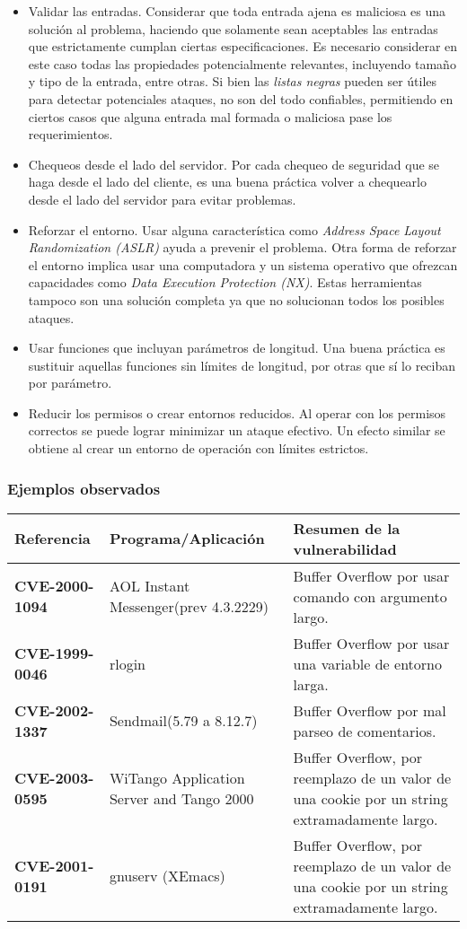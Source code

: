 \begin{itemize}
    \item Validar las entradas.
	Considerar que toda entrada ajena es maliciosa es una solución al problema, haciendo que solamente sean aceptables las entradas que estrictamente cumplan ciertas especificaciones.
	Es necesario considerar en este caso todas las propiedades potencialmente relevantes, incluyendo tamaño y tipo de la entrada, entre otras.
	Si bien las \textit{listas negras} pueden ser útiles para detectar potenciales ataques, no son del todo confiables, permitiendo en ciertos casos que alguna entrada mal formada o maliciosa
	pase los requerimientos.
    \item Chequeos desde el lado del servidor. Por cada chequeo de seguridad que se haga desde el lado del cliente, es una buena práctica volver a chequearlo desde el lado del servidor para
	evitar problemas.
    \item Reforzar el entorno. Usar alguna característica como \textit{Address Space Layout Randomization (ASLR)} ayuda a prevenir el problema.
	Otra forma de reforzar el entorno implica usar una computadora y un sistema operativo que ofrezcan capacidades como \textit{Data Execution Protection (NX)}.
	Estas herramientas tampoco son una solución completa ya que no solucionan todos los posibles ataques.
    \item Usar funciones que incluyan parámetros de longitud. Una buena práctica es sustituir aquellas funciones sin límites de longitud, por otras que sí lo reciban por parámetro.

    \item Reducir los permisos o crear entornos reducidos. Al operar con los permisos correctos se puede lograr minimizar un ataque efectivo. Un efecto similar se obtiene al crear un
	entorno de operación con límites estrictos.
\end{itemize}

\subsubsection{Ejemplos observados}

\begin{tabular}[\baselineskip]{|p{1.75cm}|p{3.5cm}|p{8cm}|}
  \hline
  \textbf{Referencia} & Programa/Aplicación & Resumen de la vulnerabilidad \\
  \hline
  \textbf{CVE-2000- 1094} & AOL Instant Messenger(prev 4.3.2229) & Buffer Overflow por usar comando con argumento largo. \\
  \hline
  \textbf{CVE-1999- 0046} & rlogin & Buffer Overflow por usar una variable de entorno larga. \\
  \hline
  \textbf{CVE-2002- 1337} & Sendmail(5.79 a 8.12.7) & Buffer Overflow por mal parseo de comentarios. \\
  \hline
  \textbf{CVE-2003- 0595} & WiTango Application Server and Tango 2000 & Buffer Overflow, por reemplazo de un valor de una cookie por un string extramadamente largo.\\
  \hline
  \textbf{CVE-2001- 0191} & gnuserv (XEmacs) & Buffer Overflow, por reemplazo de un valor de una cookie por un string extramadamente largo. \\
  \hline
\end{tabular}
